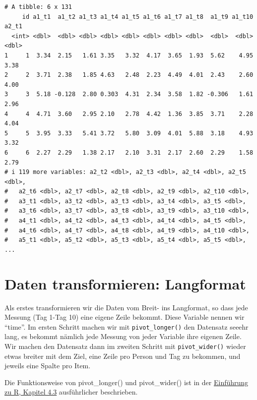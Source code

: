 \documentclass[
  letterpaper,
  DIV=11,
  numbers=noendperiod]{scrreprt}
\begin{document}
\begin{verbatim}
# A tibble: 6 x 131
     id a1_t1  a1_t2 a1_t3 a1_t4 a1_t5 a1_t6 a1_t7 a1_t8  a1_t9 a1_t10 a2_t1
  <int> <dbl>  <dbl> <dbl> <dbl> <dbl> <dbl> <dbl> <dbl>  <dbl>  <dbl> <dbl>
1     1  3.34  2.15   1.61 3.35   3.32  4.17  3.65  1.93  5.62    4.95  3.38
2     2  3.71  2.38   1.85 4.63   2.48  2.23  4.49  4.01  2.43    2.60  4.00
3     3  5.18 -0.128  2.80 0.303  4.31  2.34  3.58  1.82 -0.306   1.61  2.96
4     4  4.71  3.60   2.95 2.10   2.78  4.42  1.36  3.85  3.71    2.28  4.04
5     5  3.95  3.33   5.41 3.72   5.80  3.09  4.01  5.88  3.18    4.93  3.32
6     6  2.27  2.29   1.38 2.17   2.10  3.31  2.17  2.60  2.29    1.58  2.79
# i 119 more variables: a2_t2 <dbl>, a2_t3 <dbl>, a2_t4 <dbl>, a2_t5 <dbl>,
#   a2_t6 <dbl>, a2_t7 <dbl>, a2_t8 <dbl>, a2_t9 <dbl>, a2_t10 <dbl>,
#   a3_t1 <dbl>, a3_t2 <dbl>, a3_t3 <dbl>, a3_t4 <dbl>, a3_t5 <dbl>,
#   a3_t6 <dbl>, a3_t7 <dbl>, a3_t8 <dbl>, a3_t9 <dbl>, a3_t10 <dbl>,
#   a4_t1 <dbl>, a4_t2 <dbl>, a4_t3 <dbl>, a4_t4 <dbl>, a4_t5 <dbl>,
#   a4_t6 <dbl>, a4_t7 <dbl>, a4_t8 <dbl>, a4_t9 <dbl>, a4_t10 <dbl>,
#   a5_t1 <dbl>, a5_t2 <dbl>, a5_t3 <dbl>, a5_t4 <dbl>, a5_t5 <dbl>, ...
\end{verbatim}

\section{Daten transformieren:
Langformat}\label{daten-transformieren-langformat}

Als erstes transformieren wir die Daten vom Breit- ins Langformat, so
dass jede Messung (Tag 1-Tag 10) eine eigene Zeile bekommt. Diese
Variable nennen wir ``time''. Im ersten Schritt machen wir mit
\texttt{pivot\_longer()} den Datensatz seeehr lang, es bekommt nämlich
jede Messung von jeder Variable ihre eigenen Zeile. Wir machen den
Datensatz dann im zweiten Schritt mit \texttt{pivot\_wider()} wieder
etwas breiter mit dem Ziel, eine Zeile pro Person und Tag zu bekommen,
und jeweils eine Spalte pro Item.

Die Funktionsweise von pivot\_longer() und pivot\_wider() ist in der
\href{https://methodenlehre.github.io/einfuehrung-in-R/chapters/04-tidyverse.html\#4_3_reshaping}{Einführung
zu R, Kapitel 4.3} ausführlicher beschrieben.
\end{document}
